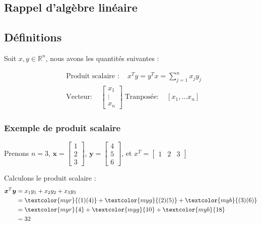 \documentclass{report}
\begin{document}
\begin{multicols*}{2}
    \chapter{Rappel d'algèbre linéaire}

    \section{Définitions}

    Soit $x, y \in \mathbb{R}^n$, nous avons les quantités suivantes :

    \begin{align*}
        &\text{Produit scalaire } : \quad  x^{T}y = y^Tx = \sum_{j=1}^{n }x_jy_j \\ 
        &\text{Vecteur} : \quad
        \begin{bmatrix} x_1 \\ \vdots \\ x_n \end{bmatrix} \;
        \text{Tranposée} : \quad [x_1, \dots x_n]
    \end{align*}            



\noindent
\subsection{Exemple de produit scalaire}

Prenons \( n = 3 \), \( \boldsymbol{x} = \begin{bmatrix} 1 \\ 2 \\ 3 \end{bmatrix} \),
\( \boldsymbol{y} = \begin{bmatrix} 4 \\ 5 \\ 6 \end{bmatrix} \), et 
$x^T = \begin{bmatrix} 1 & 2 & 3\end{bmatrix}$

Calculons le produit scalaire :
\begin{align*}
    \boldsymbol{x}^T \boldsymbol{y} &= x_1 y_1 + x_2 y_2 + x_3 y_3 \\
          &= \textcolor{myr}{(1)(4)} + \textcolor{myg}{(2)(5)} + \textcolor{myb}{(3)(6)} \\
          &= \textcolor{myr}{4} + \textcolor{myg}{10} + \textcolor{myb}{18} \\
          &= 32
\end{align*}


\end{multicols*}
\end{document}
